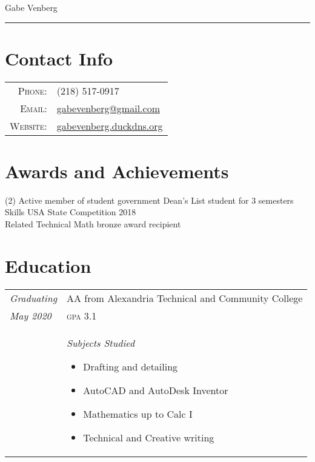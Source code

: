 \documentclass[letterpaper,10pt]{article}
\begin{document}
\pagestyle{empty}%

	\par{\centering
		{\huge Gabe Venberg
	}\bigskip\par}
\hrule
\section*{Contact Info}
	\begin{tabular}{rl}
	\textsc{Phone:} & (218) 517-0917\\
	\textsc{Email:} & \href{mailto:gabevenberg@gmail.com}{gabevenberg@gmail.com}\\
	\textsc{Website:} & \href{gabevenberg.duckdns.org}{gabevenberg.duckdns.org}\\
	\end{tabular}
\section*{Awards and Achievements}
	\begin{tasks}[style=itemize](2)
	\task Active member of student government
	\task Dean's List student for 3 semesters
	\task Skills USA State Competition 2018\\Related Technical Math bronze award recipient
	\end{tasks}
\section*{Education}
	\begin{tabular}{R{2cm}|p{14cm}}
	\textsl{Graduating} & AA from Alexandria Technical and Community College\\
	\textsl{May 2020} & \textsc{gpa} 3.1\\
	&\textsl{Subjects Studied} \begin{itemize}[noitemsep]
	\item Drafting and detailing
	\item AutoCAD and AutoDesk Inventor
	\item Mathematics up to Calc I
	\item Technical and Creative writing
	\end{itemize}
	\end{tabular}
\end{document}
